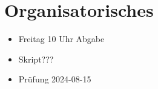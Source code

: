 \section*{Organisatorisches}
\begin{itemize}
	\item Freitag 10 Uhr Abgabe
	\item Skript???
	\item Prüfung 2024-08-15
\end{itemize}


